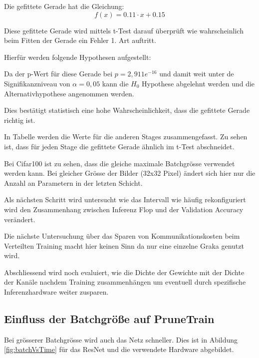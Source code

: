 Die gefittete Gerade hat die Gleichung: $$ f(x)=0.11 \cdot x +  0.15 $$

Diese gefittete Gerade wird mittels t-Test darauf überprüft wie wahrscheinlich beim Fitten der Gerade ein Fehler 1. Art auftritt.

Hierfür werden folgende Hypothesen aufgestellt:


Da der p-Wert für diese Gerade bei $p=2,911e^{-16}$ und damit weit unter de Signifikanzniveau von $\alpha=0,05$ kann die $H_0$ Hypothese abgelehnt werden und die Alternativhypothese angenommen werden.

Dies bestätigt statistisch eine hohe Wahrscheinlichkeit, dass die gefittete Gerade richtig ist.


In Tabelle  werden die Werte für die anderen Stages zusammengefasst. Zu sehen ist, dass für jeden Stage die gefittete Gerade ähnlich im t-Test abschneidet.




Bei Cifar100 ist zu sehen, dass die gleiche maximale Batchgrösse verwendet werden kann. Bei gleicher Grösse der Bilder (32x32 Pixel) ändert sich hier nur die Anzahl an Parametern in der letzten Schicht.





Als nächsten Schritt wird untersucht wie das Intervall wie häufig rekonfiguriert wird den Zusammenhang zwischen Inferenz Flop und der Validation Accuracy verändert.


Die nächste Untersuchung über das Sparen von Kommunikationskosten beim Verteilten Training macht hier keinen Sinn da nur eine einzelne Graka genutzt wird.


Abschliessend wird noch evaluiert, wie die Dichte der Gewichte mit der Dichte der Kanäle nachdem Training zusammenhängen um eventuell durch spezifische Inferenzhardware weiter zusparen.





\subsection{Einfluss der Batchgröße auf PruneTrain}\label{sec:batch}
Bei grösserer Batchgrösse wird auch das Netz schneller. Dies ist in Abildung \ref{fig:batchVsTime} für das ResNet und die verwendete Hardware abgebildet.

